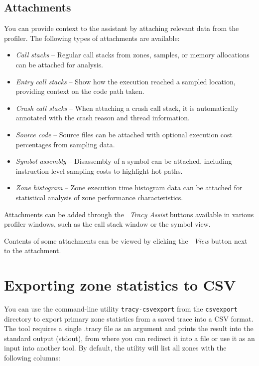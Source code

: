 \documentclass[hidelinks,titlepage,a4paper,twoside]{article}
\begin{document}
\subsection{Attachments}

You can provide context to the assistant by attaching relevant data from the profiler. The following types of attachments are available:

\begin{itemize}
\item \emph{Call stacks} -- Regular call stacks from zones, samples, or memory allocations can be attached for analysis.
\item \emph{Entry call stacks} -- Show how the execution reached a sampled location, providing context on the code path taken.
\item \emph{Crash call stacks} -- When attaching a crash call stack, it is automatically annotated with the crash reason and thread information.
\item \emph{Source code} -- Source files can be attached with optional execution cost percentages from sampling data.
\item \emph{Symbol assembly} -- Disassembly of a symbol can be attached, including instruction-level sampling costs to highlight hot paths.
\item \emph{Zone histogram} -- Zone execution time histogram data can be attached for statistical analysis of zone performance characteristics.
\end{itemize}

Attachments can be added through the \emph{\faRobot{}~Tracy Assist} buttons available in various profiler windows, such as the call stack window or the symbol view.

Contents of some attachments can be viewed by clicking the \emph{\faEye{}~View} button next to the attachment.

\section{Exporting zone statistics to CSV}
\label{csvexport}

You can use the command-line utility \texttt{tracy-csvexport} from the \texttt{csvexport} directory to export primary zone statistics from a saved trace into a CSV format.
The tool requires a single .tracy file as an argument and prints the result into the standard output (stdout), from where you can redirect it into a file or use it as an input into another tool.
By default, the utility will list all zones with the following columns:
\end{document}

